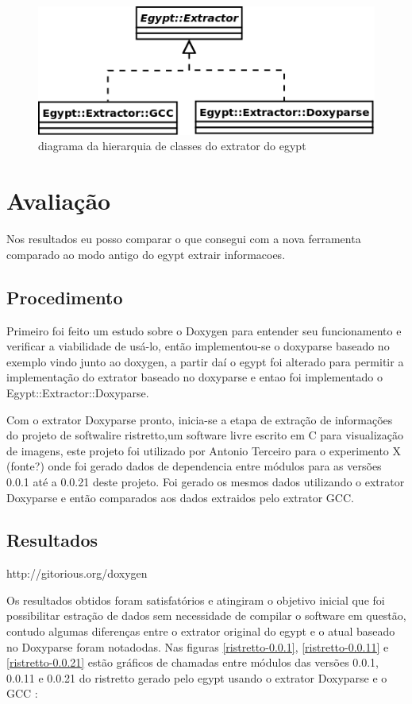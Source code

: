 \begin{figure}[h]
\center
\includegraphics[scale=0.5]{imagens/egypt-diagram-extractor}
\caption{diagrama da hierarquia de classes do extrator do egypt}
\label{egypt-diagram-extractor}
\end{figure}

\chapter{Avaliação}

Nos resultados eu posso comparar o que consegui com a nova ferramenta comparado ao modo antigo do egypt extrair informacoes.

\section{Procedimento}

Primeiro foi feito um estudo sobre o Doxygen para entender seu funcionamento e
verificar a viabilidade de usá-lo, então implementou-se o doxyparse baseado no
exemplo vindo junto ao doxygen, a partir daí o egypt foi alterado para permitir
a implementação do extrator baseado no doxyparse e entao foi implementado o
Egypt::Extractor::Doxyparse.

Com o extrator Doxyparse pronto, inicia-se a etapa de extração de informações do projeto de softwalire ristretto,um software livre escrito em C para visualização de imagens, este projeto foi utilizado por Antonio Terceiro para o experimento X (fonte?) onde foi gerado dados de dependencia entre módulos para as versões 0.0.1 até a 0.0.21 deste projeto. Foi gerado os mesmos dados utilizando o extrator Doxyparse e então comparados aos dados extraidos pelo extrator GCC.

\section{Resultados}

http://gitorious.org/doxygen

Os resultados obtidos foram satisfatórios e atingiram o objetivo inicial que foi possibilitar estração de dados sem necessidade de compilar o software em questão, contudo algumas diferenças entre o extrator original do egypt e o atual baseado no Doxyparse foram notadodas. Nas figuras \ref{ristretto-0.0.1}, \ref{ristretto-0.0.11} e \ref{ristretto-0.0.21} estão gráficos de chamadas entre módulos das versões 0.0.1, 0.0.11 e 0.0.21 do ristretto gerado pelo egypt usando o extrator Doxyparse e o GCC :

